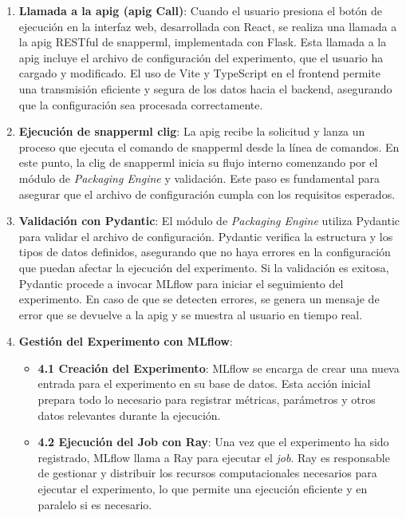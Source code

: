 \begin{enumerate}
    \item \textbf{Llamada a la \Gls{apig} (\Gls{apig} Call)}: Cuando el usuario presiona el botón de ejecución en la interfaz web, desarrollada con React, se realiza una llamada a la \Gls{apig} RESTful de \Gls{snapperml}, implementada con Flask. Esta llamada a la \Gls{apig} incluye el archivo de configuración del experimento, que el usuario ha cargado y modificado. El uso de Vite y TypeScript en el \gls{frontend} permite una transmisión eficiente y segura de los datos hacia el \gls{backend}, asegurando que la configuración sea procesada correctamente.
    \item \textbf{Ejecución de \Gls{snapperml} \Gls{clig}}:
          La \Gls{apig} recibe la solicitud y lanza un proceso que ejecuta el comando de \Gls{snapperml} desde la línea de comandos. En este punto, la \Gls{clig} de \Gls{snapperml} inicia su flujo interno comenzando por el módulo de \textit{Packaging Engine} y validación. Este paso es fundamental para asegurar que el archivo de configuración cumpla con los requisitos esperados.

    \item \textbf{Validación con Pydantic}:
          El módulo de \textit{Packaging Engine} utiliza Pydantic para validar el archivo de configuración. Pydantic verifica la estructura y los tipos de datos definidos, asegurando que no haya errores en la configuración que puedan afectar la ejecución del experimento. Si la validación es exitosa, Pydantic procede a invocar MLflow para iniciar el seguimiento del experimento. En caso de que se detecten errores, se genera un mensaje de error que se devuelve a la \Gls{apig} y se muestra al usuario en tiempo real.

    \item \textbf{Gestión del Experimento con MLflow}:
          \begin{itemize}
              \item \textbf{4.1 Creación del Experimento}: MLflow se encarga de crear una nueva entrada para el experimento en su base de datos. Esta acción inicial prepara todo lo necesario para registrar métricas, parámetros y otros datos relevantes durante la ejecución.
              \item \textbf{4.2 Ejecución del Job con Ray}: Una vez que el experimento ha sido registrado, MLflow llama a Ray para ejecutar el \textit{job}. Ray es responsable de gestionar y distribuir los recursos computacionales necesarios para ejecutar el experimento, lo que permite una ejecución eficiente y en paralelo si es necesario.
          \end{itemize}


\end{enumerate}
